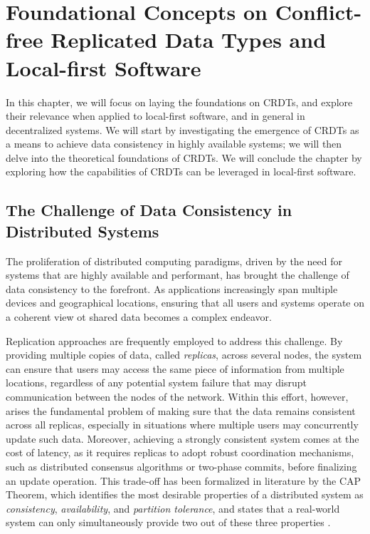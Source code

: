 \chapter{
    Foundational Concepts on Conflict-free Replicated Data Types and Local-first Software
}

In this chapter, we will focus on laying the foundations on CRDTs, and explore their
relevance when applied to local-first software, and in general in decentralized systems. We
will start by investigating the emergence of CRDTs as a means to achieve data consistency in
highly available systems; we will then delve into the theoretical foundations of CRDTs. We
will conclude the chapter by exploring how the capabilities of CRDTs can be leveraged in
local-first software.

\section{The Challenge of Data Consistency in Distributed Systems}

The proliferation of distributed computing paradigms, driven by the need for systems that are
highly available and performant, has brought the challenge of data consistency to the
forefront. As applications increasingly span multiple devices and geographical locations,
ensuring that all users and systems operate on a coherent view ot shared data becomes a
complex endeavor.

Replication approaches are frequently employed to address this challenge. By providing
multiple copies of data, called \textit{replicas}, across several nodes, the system can
ensure that users may access the same piece of information from multiple locations,
regardless of any potential system failure that may disrupt communication between the nodes
of the network. Within this effort, however, arises the fundamental problem of making sure
that the data remains consistent across all replicas, especially in situations where
multiple users may concurrently update such data. Moreover, achieving a strongly consistent
system comes at the cost of latency, as it requires replicas to adopt robust coordination
mechanisms, such as distributed consensus algorithms or two-phase commits, before finalizing
an update operation. This trade-off has been formalized in literature by the CAP Theorem,
which identifies the most desirable properties of a distributed system as
\textit{consistency}, \textit{availability}, and \textit{partition tolerance}, and
states that a real-world system can only simultaneously provide two out of these three
properties \cite{gilbert2002brewers}.

